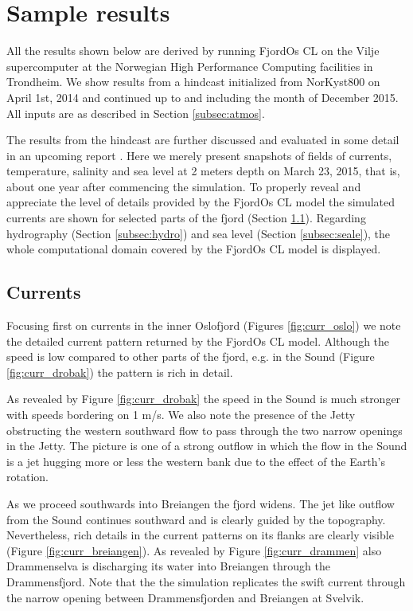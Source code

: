 \section{Sample results}
\label{sec:resul}
All the results shown below are derived by running FjordOs CL on the Vilje supercomputer at the Norwegian High Performance Computing facilities in Trondheim. We show results from a hindcast initialized from NorKyst800 on April 1st, 2014 and continued up to and including the month of December 2015. All inputs are as described in Section \ref{subsec:atmos}.
 
The results from the hindcast are further discussed and evaluated in some detail in an upcoming report \citep{hjelm:etal:2016}. Here we merely present snapshots of fields of currents, temperature, salinity and sea level at 2 meters depth on March 23, 2015, that is, about one year after commencing the simulation. To properly reveal and appreciate the level of details provided by the FjordOs CL model the simulated currents are shown for selected parts of the fjord (Section \ref{subsec:curre}). Regarding hydrography (Section \ref{subsec:hydro}) and sea level (Section \ref{subsec:seale}), the whole computational domain covered by the FjordOs CL model is displayed.  %

\subsection{Currents}
\label{subsec:curre}
Focusing first on currents in the inner Oslofjord (Figures \ref{fig:curr_oslo}) we note the detailed current pattern returned by the FjordOs CL model. Although the speed is low compared to other parts of the fjord, e.g. in the {\DR} Sound (Figure \ref{fig:curr_drobak}) the pattern is rich in detail. 
 

As revealed by Figure \ref{fig:curr_drobak} the speed in the {\DR} Sound is much stronger with speeds bordering on 1 m/s. We also note the presence of the Jetty obstructing the western southward flow to pass through the two narrow openings in the Jetty. The picture is one of a strong outflow in which the flow in the {\DR} Sound is a jet hugging more or less the western bank due to the effect of the Earth's rotation.   
 

As we proceed southwards into Breiangen the fjord widens. The jet like outflow from the {\DR} Sound continues southward and is clearly guided by the topography. Nevertheless, rich details in the current patterns on its flanks  are clearly visible (Figure \ref{fig:curr_breiangen}). As revealed by Figure \ref{fig:curr_drammen} also Drammenselva is discharging its water into Breiangen through the Drammensfjord. Note that the the simulation replicates the swift current through the narrow opening between Drammensfjorden and Breiangen at Svelvik.  
\clearpage
   
 

